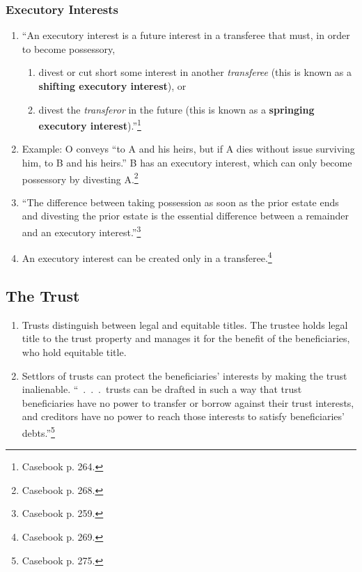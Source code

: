 \subsubsection{Executory Interests}

\begin{enumerate}
    \item ``An executory interest is a future interest in a transferee that 
    must, in order to become possessory,
    \begin{enumerate}
        \item divest or cut short some interest in another \emph{transferee} 
        (this is known as a \textbf{shifting executory interest}), or
        \item divest the \emph{transferor} in the future (this is known as a 
        \textbf{springing executory interest}).''\footnote{Casebook p. 264.}
    \end{enumerate}
    \item Example: O conveys ``to A and his heirs, but if A dies without issue 
    surviving him, to B and his heirs.'' B has an executory interest, which 
    can only become possessory by divesting A.\footnote{Casebook p. 268.}
    \item ``The difference between taking possession as soon as the prior 
    estate ends and divesting the prior estate is the essential difference 
    between a remainder and an executory interest.''\footnote{Casebook p. 259.}
    \item An executory interest can be created only in a 
    transferee.\footnote{Casebook p. 269.}
\end{enumerate}


\subsection{The Trust}

\begin{enumerate}
    \item Trusts distinguish between legal and equitable titles. The trustee 
    holds legal title to the trust property and manages it for the benefit of 
    the beneficiaries, who hold equitable title.
    \item Settlors of trusts can protect the beneficiaries' interests by 
    making the trust inalienable. ``~.~.~.~trusts can be drafted in such a way 
    that trust beneficiaries have no power to transfer or borrow against their 
    trust interests, and creditors have no power to reach those interests to 
    satisfy beneficiaries' debts.''\footnote{Casebook p. 275.}
\end{enumerate}

